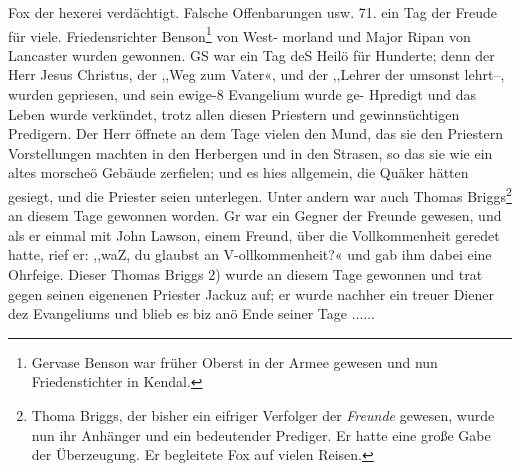 Fox der hexerei verdächtigt. Falsche Offenbarungen usw. 71.
ein Tag der Freude für viele. Friedensrichter 
Benson\footnote{Gervase Benson war früher Oberst in der 
Armee gewesen und nun
Friedenstichter in Kendal.} von West-
morland und Major Ripan von Lancaster wurden gewonnen.
GS war ein Tag deS Heilö für Hunderte; denn der Herr Jesus
Christus, der ,,Weg zum Vater«, und der ,,Lehrer der umsonst
lehrt--, wurden gepriesen, und sein ewige-8 Evangelium wurde ge-
Hpredigt und das Leben wurde verkündet, trotz allen diesen Priestern
und gewinnsüchtigen Predigern. Der Herr öffnete an dem Tage
vielen den Mund, das sie den Priestern Vorstellungen machten
in den Herbergen und in den Strasen, so das sie wie ein altes
morscheö Gebäude zerfielen; und es hies allgemein, die Quäker
hätten gesiegt, und die Priester seien unterlegen. Unter andern
war auch Thomas Briggs\footnote{Thoma Briggs, der bisher 
ein eifriger Verfolger der \textit{Freunde} gewesen, 
wurde nun ihr Anhänger und ein bedeutender Prediger. 
Er hatte eine große Gabe der Überzeugung. Er begleitete 
Fox auf vielen Reisen.} an diesem 
Tage gewonnen worden. Gr
war ein Gegner der Freunde gewesen, und als er einmal mit
John Lawson, einem Freund, über die Vollkommenheit geredet hatte,
rief er: ,,waZ, du glaubst an V-ollkommenheit?« und gab ihm dabei
eine Ohrfeige. Dieser Thomas Briggs 2) wurde an diesem Tage
gewonnen und trat gegen seinen eigenenen Priester Jackuz auf; er
wurde nachher ein treuer Diener dez Evangeliums und blieb es
biz anö Ende seiner Tage ......
